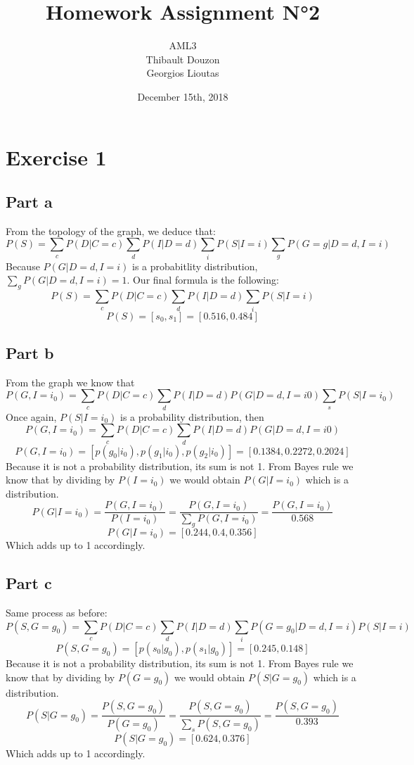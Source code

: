 \documentclass[a4paper, 10pt]{article}
\title{Homework Assignment N°2}
\author{AML3\\Thibault Douzon\\Georgios Lioutas}
\date{December 15th, 2018}
\begin{document}
\maketitle

\pagebreak

\tableofcontents

\pagebreak
\section{Exercise 1}
\subsection{Part a}
From the topology of the graph, we deduce that:
$$
P(S) = \sum_c P(D\vert C=c) \sum_d P(I\vert D=d) \sum_i P(S\vert I=i) \sum_g P(G=g\vert D=d, I=i)
$$
Because $P(G\vert D=d, I=i)$ is a probabitlity distribution, $\sum_g P(G\vert D=d, I=i) = 1$.
Our final formula is the following:
$$
P(S) = \sum_c P(D\vert C=c) \sum_d P(I\vert D=d) \sum_i P(S\vert I=i)
$$
$$
P(S) = \left[s_0, s_1\right] = \left[0.516, 0.484\right]
$$
\subsection{Part b}
From the graph we know that
$$
P(G, I=i_0) = \sum_c P(D\vert C=c) \sum_d P(I\vert D=d) P(G\vert D=d, I=i0) \sum_s P(S\vert I=i_0) 
$$
Once again, $P(S\vert I=i_0)$ is a probability distribution, then
$$
P(G, I=i_0) = \sum_c P(D\vert C=c) \sum_d P(I\vert D=d) P(G\vert D=d, I=i0)
$$
$$
P(G, I=i_0) = \left[p(g_0\vert i_0), p(g_1\vert i_0), p(g_2\vert i_0)\right] = \left[0.1384, 0.2272, 0.2024\right]
$$
Because it is not a probability distribution, its sum is not 1. From Bayes rule we know that by dividing by 
$P(I=i_0)$ we would obtain $P(G\vert I=i_0)$ which is a distribution.
$$
P(G\vert I=i_0) = \frac{P(G,I=i_0)}{P(I=i_0)} = \frac{P(G,I=i_0)}{\sum_g P(G,I=i_0)} = \frac{P(G,I=i_0)}{0.568}
$$
$$
P(G\vert I=i_0) =\left[0.244, 0.4, 0.356\right]
$$
Which adds up to 1 accordingly.
\subsection{Part c}
Same process as before:
$$
P(S, G=g_0) = \sum_c P(D\vert C=c) \sum_d P(I\vert D=d) \sum_i P(G=g_0\vert D=d, I=i) P(S\vert I=i)
$$
$$
P(S, G=g_0) = \left[p(s_0\vert g_0), p(s_1\vert g_0)\right] = \left[0.245, 0.148\right]
$$
Because it is not a probability distribution, its sum is not 1. From Bayes rule we know that by dividing by 
$P(G=g_0)$ we would obtain $P(S\vert G=g_0)$ which is a distribution.
$$
P(S\vert G=g_0) = \frac{P(S,G=g_0)}{P(G=g_0)} = \frac{P(S,G=g_0)}{\sum_s P(S,G=g_0)} = \frac{P(S,G=g_0)}{0.393}
$$
$$
P(S\vert G=g_0) =\left[0.624,0.376\right]
$$
Which adds up to 1 accordingly.
\end{document}
